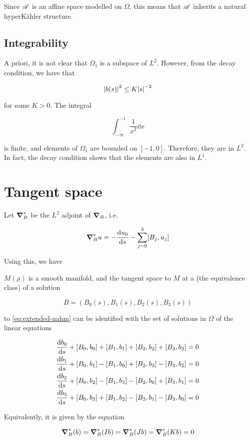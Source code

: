 \documentclass{report}
\begin{document}
Since \(\mathscr{A}\) is an affine space modelled on \(\Omega\), this means that \(\mathscr{A}\) inherits a natural hyperK\"ahler structure.

\subsection{Integrability}

A priori, it is not clear that \(\Omega_1\) is a subspace of \(L^2\). However, from the decay condition, we have that

\[\abs{b(s)}^2 \le K \abs{s}^{-2}\]

for some \(K > 0\). The integral

\[\int_{-\infty}^{-1}\frac{1}{x^2}\dd x\]

is finite, and elements of \(\Omega_1\) are bounded on \([-1, 0]\). Therefore, they are in \(L^2\). In fact, the decay condition shows that the elements are also in \(L^1\).

\section{Tangent space}

Let \(\grad_B^*\) be the \(L^2\) adjoint of \(\grad_B\), i.e.

\[\grad_B^*u = - \dv{u_0}{s} - \sum_{j=0}^3[B_j, u_j]\]

Using this, we have

\begin{proposition}
    \label{prop:tangent-space} \(M(\rho)\) is a smooth manifold, and the tangent space to \(M\) at a (the equivalence class) of a solution 
    
    \[B = (B_0(s), B_1(s), B_2(s), B_3(s))\] 
    
    to \cref{eq:extended-nahm} can be identified with the set of solutions in \(\Omega\) of the linear equations

    \begin{equation}
        \label{eq:tangent-space}
        \begin{split}
            \dv{b_0}{s} + [B_0, b_0] + [B_1, b_1] + [B_2, b_2] + [B_3, b_3] &= 0 \\
            \dv{b_1}{s} + [B_0, b_1] - [B_1, b_0] + [B_2, b_3] - [B_3, b_2] &= 0 \\
            \dv{b_2}{s} + [B_0, b_2] - [B_1, b_3] - [B_2, b_0] + [B_3, b_1] &= 0 \\
            \dv{b_3}{s} + [B_0, b_3] + [B_1, b_2] - [B_2, b_1] - [B_3, b_0] &= 0
        \end{split}
    \end{equation}

    Equivalently, it is given by the equation

    \[\grad^*_B(b) = \grad^*_B(Ib) = \grad^*_B(Jb) = \grad^*_B(Kb) = 0\]
\end{proposition}
\end{document}
